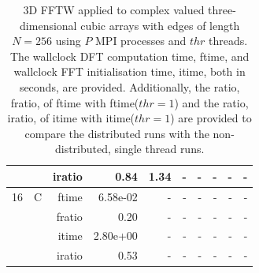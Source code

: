 \documentclass[a4paper]{article}
\begin{document}
\begin{table}[htbp]
\begin{center}
\begin{small}
\begin{tabular}{|r|r|r|r|r|r|r|r|r|r|}
          &      & iratio & 0.84 & 1.34 &     -     &     -     &     -     &     -     &     -     \\ \hline 
     16 & C & ftime & 6.58e-02 &     -     &     -     &     -     &     -     &     -     &     -     \\   
          &      & fratio & 0.20 &     -     &     -     &     -     &     -     &     -     &     -     \\   
          &      & itime & 2.80e+00 &     -     &     -     &     -     &     -     &     -     &     -     \\   
          &      & iratio & 0.53 &     -     &     -     &     -     &     -     &     -     &     -     \\ \hline 

\end{tabular}
\caption{3D FFTW applied to complex valued three-dimensional cubic arrays with edges of length $N=256$ using $P$ MPI processes and $thr$ threads. The wallclock DFT computation time, ftime, and wallclock FFT initialisation time, itime, both in seconds, are provided. Additionally, the ratio, fratio, of ftime  with ftime($thr=1$) and the ratio, iratio, of itime  with itime($thr=1$) are provided to compare the distributed runs with the non-distributed, single thread runs.  }\label{TblFFTW3d256c}
\end{small}
\end{center}
\end{table}
\end{document}

